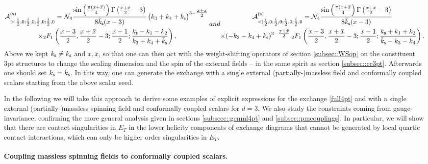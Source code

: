 \documentclass[11pt,a4paper]{article}
\begin{document}
\begin{subequations}
\begin{multline}\label{exchseed1}
   \mathcal{A}^{({\sf  s})}_{>|\tfrac{i}{2},0;\tfrac{i}{2},0;\tfrac{i}{2},0;\tfrac{i}{2},0}= {\cal N}_4\frac{\sin \left(\tfrac{\pi(x+\bar{x})}{4} \right) \Gamma \left(\tfrac{x+\bar{x}}2-3\right)}{8 {\bar k}_{\sf s}(x-3)} \left(k_3+k_4+{\bar k}_{\sf s}\right)^{3-\tfrac{x+\bar{x}}2} \,\\ \times  _2F_1\left(\frac{x-3}{2},\frac{x+\bar{x}}2-3;\frac{x-1}{2};\frac{k_{\sf s}-k_1-k_2}{k_3+k_4+{\bar k}_{\sf s}}\right),
\end{multline}
and
\begin{multline}\label{exchseed2}
   \mathcal{A}^{({\sf  s})}_{<|\tfrac{i}{2},0;\tfrac{i}{2},0;\tfrac{i}{2},0;\tfrac{i}{2},0} = {\cal N}_4\frac{\sin \left(\tfrac{\pi(x+\bar{x}}{4} \right)\Gamma \left(\tfrac{x+\bar{x}}2-3\right) }{8 {\bar k}_{\sf s} (x-3)}\\ \times (-k_3-k_4+{\bar k}_{\sf s})^{3-\tfrac{x+\bar{x}}2} \, _2F_1\left(\frac{x-3}{2},\frac{x+\bar{x}}2-3;\frac{x-1}{2};\frac{k_{\sf s}+k_1+k_2}{{\bar k}_{\sf s}-k_3-k_4}\right).
\end{multline}
\end{subequations}
Above we kept ${\bar k}_{\sf s} \ne k_{{\sf s}}$ and $x, {\bar x}$, so that one can then act with the weight-shifting operators of section \ref{subsec::WSop} on the constituent 3pt structures to change the scaling dimension and the spin of the external fields -- in the same spirit as section \ref{subsec::cc3pt}.  Afterwards one should set $k_{{\sf s}} = {\bar k}_{\sf s}$. In this way, one can generate the exchange with a single external (partially-)massless field and conformally coupled scalars starting from the above scalar seed.

In the following we will take this approach to derive some examples of explicit expressions for the exchange \eqref{full4pt} and with a single external (partially-)massless spinning field and conformally coupled scalars for $d=3$. We also study the constraints coming from gauge-invariance, confirming the more general analysis given in sections \ref{subsecc::genml4pt} and \ref{subsec::pmcouplings}. In particular, we will show that there are contact singularities in $E_T$ in the lower helicity components of exchange diagrams that cannot be generated by local quartic contact interactions, which can only be higher order singularities in $E_T$.

\paragraph{Coupling massless spinning fields to conformally coupled scalars.}
\end{document}
